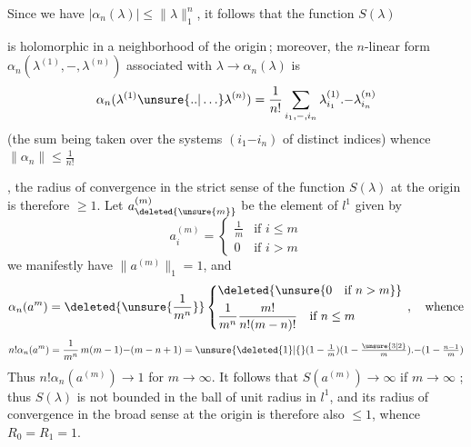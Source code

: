 Since we have $|\alpha_n(\lambda)|\leq\|\lambda\|_1^n$, it follows that
the function $S(\lambda)$ 
is holomorphic in a neighborhood
of the origin\,; moreover, the $n$-linear form
$\alpha_n(\lambda^{(1)},\mathord{-},\lambda^{(n)})$ associated with
$\lambda\to\alpha_n(\lambda)$ is
\[
\alpha_n(\lambda^{(1)}\unsure{\mathord{.}\mathord{.}|\ldots}\lambda^{(n)})
=\frac{1}{n!}\sum_{i_1,\mathord{-},i_n}
\lambda^{(1)}_{i_1}\mathord{.}\mathord{-}\lambda^{(n)}_{i_n}
\]
(the sum being taken over the systems $(i_1\mathord{-}i_n)$ of distinct indices)
whence $\|\alpha_n\|\leq\frac{1}{n!}$
,
the radius of convergence
in the strict sense  of the function $S(\lambda)$ at the origin is
therefore  $\geq1$.
Let  $a_{\deleted{\unsure{m}}}^{(m)}$ be the element of $l^1$
 given by
\[
a_i^{(m)}=\begin{cases}
\frac{1}{m}&\text{if }i\leq m\\
0&\text{if }i>m
\end{cases}
\]
we manifestly have $\|a^{(m)}\|_1=1$, and
\[
\alpha_n(a^m)=\deleted{\unsure{\frac{1}{m^n}}}
\left\{\begin{aligned}
&\deleted{\unsure{0\quad\text{if }n>m}}\\
&\frac{1}{m^n}\frac{m!}{n!(m-n)!}\quad\text{if }n\leq m
\end{aligned}\right.\,,\quad\text{whence}
\]
\[
n!\alpha_n(a^m)=\frac{1}{m^n}\,m(m-1)\mathord{-}(m-n+1)
=\unsure{\deleted{1}|\lbrace}
(1-\tfrac{1}{m})(1-\tfrac{\unsure{3|2}}{m})
\mathord{.}\mathord{-}(1-\tfrac{n-1}{m})
\]
Thus $n!\alpha_n(a^{(m)})\to1$ for $m\to\infty$.
It follows that $S(a^{(m)})\to\infty$ if $m\to\infty$ ;
thus $S(\lambda)$ is not bounded in the ball
of unit radius in $l^1$, and its radius of convergence
in the broad sense  at the origin is therefore also $\leq1$, whence $R_0=R_1=1$.

